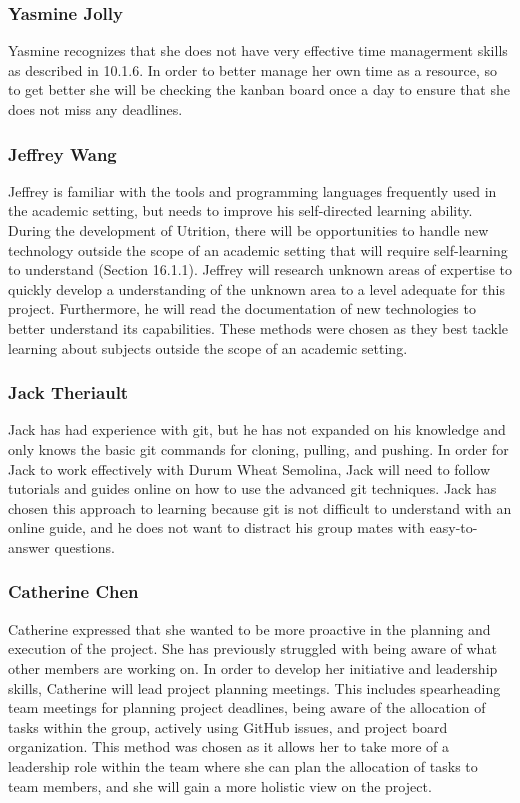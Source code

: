 \documentclass[12pt]{article}
\begin{document}
{\subsubsection{Yasmine Jolly}
Yasmine recognizes that she does not have very effective time managerment skills as described in 10.1.6. In order to better manage her own time as a resource, so to get better  she will be checking the kanban board once a day to ensure that she does not miss any deadlines. 
\subsubsection{Jeffrey Wang}
Jeffrey is familiar with the tools and programming languages frequently 
used in the academic setting, but needs to improve his self-directed learning 
ability. During the development of Utrition, there will be opportunities to 
handle new technology outside the scope of an academic setting that will 
require self-learning to understand (Section 16.1.1). Jeffrey will research 
unknown areas of expertise to quickly develop a understanding of the unknown 
area to a level adequate for this project. Furthermore, he will read the 
documentation of new technologies to better understand its capabilities. These 
methods were chosen as they best tackle learning about subjects outside the 
scope of an academic setting.
\subsubsection{Jack Theriault}
Jack has had experience with git, but he has not expanded on his knowledge and only knows the basic git commands for cloning, pulling, and pushing. In order for Jack to work effectively with Durum Wheat Semolina, Jack will need to follow tutorials and guides online on how to use the advanced git techniques. Jack has chosen this approach to learning because git is not difficult to understand with an online guide, and he does not want to distract his group mates with easy-to-answer questions.

\subsubsection{Catherine Chen}
Catherine expressed that she wanted to be more proactive in the planning and execution of the project. She has previously struggled with being aware of  what other members are working on. In order to develop her initiative and leadership skills, Catherine will lead project planning meetings. This includes spearheading team meetings for planning project deadlines, being aware of the allocation of tasks within the group, actively using GitHub issues, and project board organization. This method was chosen as it allows her to take more of a leadership role within the team where she can plan the allocation of tasks to team members, and she will gain a more holistic view on the project.
}
\end{document}
